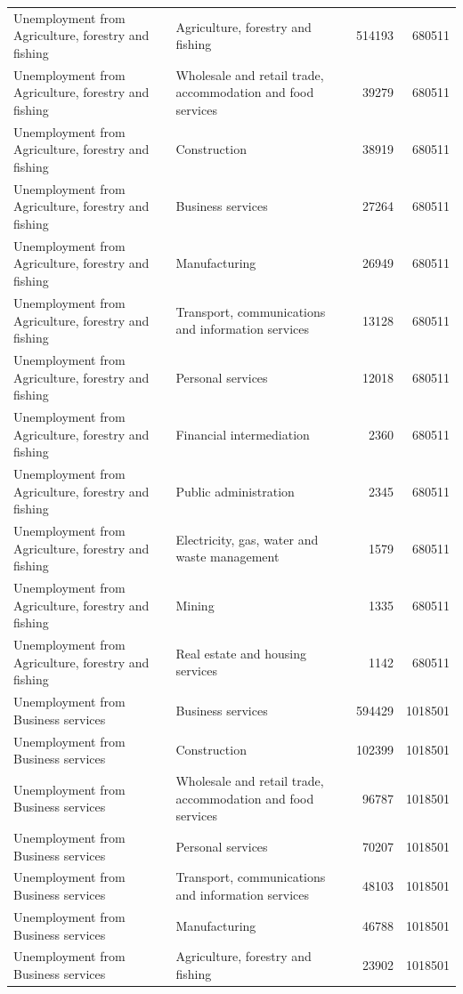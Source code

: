 \begin{longtable}{llrr}
Unemployment from Agriculture, forestry and fishing & Agriculture, forestry and fishing & 514193 & 680511 \\
Unemployment from Agriculture, forestry and fishing & Wholesale and retail trade, accommodation and food services & 39279 & 680511 \\
Unemployment from Agriculture, forestry and fishing & Construction & 38919 & 680511 \\
Unemployment from Agriculture, forestry and fishing & Business services & 27264 & 680511 \\
Unemployment from Agriculture, forestry and fishing & Manufacturing & 26949 & 680511 \\
Unemployment from Agriculture, forestry and fishing & Transport, communications and information services & 13128 & 680511 \\
Unemployment from Agriculture, forestry and fishing & Personal services & 12018 & 680511 \\
Unemployment from Agriculture, forestry and fishing & Financial intermediation & 2360 & 680511 \\
Unemployment from Agriculture, forestry and fishing & Public administration & 2345 & 680511 \\
Unemployment from Agriculture, forestry and fishing & Electricity, gas, water and waste management & 1579 & 680511 \\
Unemployment from Agriculture, forestry and fishing & Mining & 1335 & 680511 \\
Unemployment from Agriculture, forestry and fishing & Real estate and housing services & 1142 & 680511 \\
Unemployment from Business services & Business services & 594429 & 1018501 \\
Unemployment from Business services & Construction & 102399 & 1018501 \\
Unemployment from Business services & Wholesale and retail trade, accommodation and food services & 96787 & 1018501 \\
Unemployment from Business services & Personal services & 70207 & 1018501 \\
Unemployment from Business services & Transport, communications and information services & 48103 & 1018501 \\
Unemployment from Business services & Manufacturing & 46788 & 1018501 \\
Unemployment from Business services & Agriculture, forestry and fishing & 23902 & 1018501 \\

\end{longtable}
